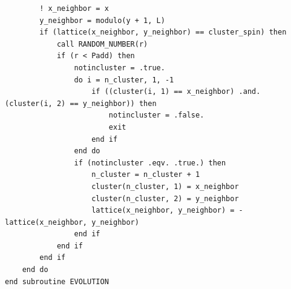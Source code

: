 \documentclass[UTF8,10pt,a4paper]{article}
\theoremstyle{Problem}
\theoremstyle{Solution}
\begin{document}
\begin{lstlisting}
        ! x_neighbor = x
        y_neighbor = modulo(y + 1, L)
        if (lattice(x_neighbor, y_neighbor) == cluster_spin) then
            call RANDOM_NUMBER(r)
            if (r < Padd) then
                notincluster = .true.
                do i = n_cluster, 1, -1
                    if ((cluster(i, 1) == x_neighbor) .and. (cluster(i, 2) == y_neighbor)) then
                        notincluster = .false.
                        exit
                    end if
                end do
                if (notincluster .eqv. .true.) then
                    n_cluster = n_cluster + 1
                    cluster(n_cluster, 1) = x_neighbor
                    cluster(n_cluster, 2) = y_neighbor
                    lattice(x_neighbor, y_neighbor) = -lattice(x_neighbor, y_neighbor)
                end if
            end if
        end if
    end do
end subroutine EVOLUTION
\end{lstlisting}
\end{document}
